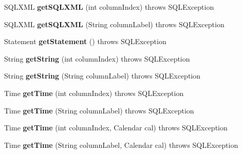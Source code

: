 \begin{DoxyCompactItemize}
S\+Q\+L\+X\+ML {\bfseries get\+S\+Q\+L\+X\+ML} (int column\+Index)  throws S\+Q\+L\+Exception 
\item 
\mbox{\label{classsimpledb_1_1jdbc_1_1ResultSetAdapter_ae9a6d14b50e3ba0b1b69c936b07885e1}} 
S\+Q\+L\+X\+ML {\bfseries get\+S\+Q\+L\+X\+ML} (String column\+Label)  throws S\+Q\+L\+Exception 
\item 
\mbox{\label{classsimpledb_1_1jdbc_1_1ResultSetAdapter_a71364467b57a0faccc463cbf0ffdd257}} 
Statement {\bfseries get\+Statement} ()  throws S\+Q\+L\+Exception 
\item 
\mbox{\label{classsimpledb_1_1jdbc_1_1ResultSetAdapter_a795b16c2a62fffe10284676c88b92bdd}} 
String {\bfseries get\+String} (int column\+Index)  throws S\+Q\+L\+Exception 
\item 
\mbox{\label{classsimpledb_1_1jdbc_1_1ResultSetAdapter_a55a81f0863549f734a7f1d0685cfd031}} 
String {\bfseries get\+String} (String column\+Label)  throws S\+Q\+L\+Exception 
\item 
\mbox{\label{classsimpledb_1_1jdbc_1_1ResultSetAdapter_a641c824636f49d8c0059080ed1b12514}} 
Time {\bfseries get\+Time} (int column\+Index)  throws S\+Q\+L\+Exception 
\item 
\mbox{\label{classsimpledb_1_1jdbc_1_1ResultSetAdapter_acd028ae120ee4611f5131e3d3f9c21a8}} 
Time {\bfseries get\+Time} (String column\+Label)  throws S\+Q\+L\+Exception 
\item 
\mbox{\label{classsimpledb_1_1jdbc_1_1ResultSetAdapter_ad7370b6f64e53d0564db14bd48131c4e}} 
Time {\bfseries get\+Time} (int column\+Index, Calendar cal)  throws S\+Q\+L\+Exception 
\item 
\mbox{\label{classsimpledb_1_1jdbc_1_1ResultSetAdapter_a3469a7510c82f4c862ca8f61be76ade5}} 
Time {\bfseries get\+Time} (String column\+Label, Calendar cal)  throws S\+Q\+L\+Exception 
\item 

\end{DoxyCompactItemize}
